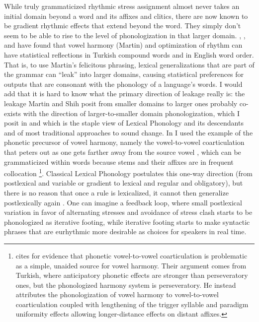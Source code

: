 \documentclass[output=paper,
modfonts
]{LSP/langsci}
\begin{document}
While truly grammaticized rhythmic stress assignment almost never takes an initial domain beyond a word and its affixes and clitics, there are now known to be gradient rhythmic effects that extend beyond the word. They simply don’t seem to be able to rise to the level of phonologization in that larger domain. \citet{martin2007}, \citet{anttila2010}, and \citet{shih2016} have found that vowel harmony (Martin) and optimization of rhythm can have statistical reflections in Turkish compound words and in English word order. That is, to use Martin’s felicitous phrasing, lexical generalizations that are part of the grammar can “leak” into larger domains, causing statistical preferences for outputs that are consonant with the phonology of a language’s words. I would add that it is hard to know what the primary direction of leakage really is: the leakage Martin and Shih posit from smaller domains to larger ones probably co-exists with the direction of larger-to-smaller domain phonologization, which I posit in \citet{kaisseforthcoming} and which is the staple view of Lexical Phonology and its descendants \citep{kiparsky1982b,bermudez-Otero2015} and of most traditional approaches to sound change. In \citet{kaisseforthcoming} I used the example of the phonetic precursor of vowel harmony, namely the vowel-to-vowel coarticulation that peters out as one gets farther away from the source vowel \citep{ohman1966,ohala1992,flemming1997}, which can be grammaticized within words because stems and their affixes are in frequent collocation \citep{bybee2006a}\footnote{\citet{barnes2006} cites \citet{inkelas2001k} for evidence that phonetic vowel-to-vowel coarticulation is problematic as a simple, unaided source for vowel harmony. Their argument comes from Turkish, where anticipatory phonetic effects are stronger than perseveratory ones, but the phonologized harmony system is perseveratory. He instead attributes the phonologization of vowel harmony to vowel-to-vowel coarticulation coupled with lengthening of the trigger syllable and paradigm uniformity effects allowing longer-distance effects on distant affixes.}. Classical Lexical Phonology postulates this one-way direction (from postlexical and variable or gradient to lexical and regular and obligatory), but there is no reason that once a rule is lexicalized, it cannot then generalize postlexically again \citep{kaisse1993}. One can imagine a feedback loop, where small postlexical variation in favor of alternating stresses and avoidance of stress clash starts to be phonologized as iterative footing, while iterative footing starts to make syntactic phrases that are eurhythmic more desirable as choices for speakers in real time. 
\end{document}
